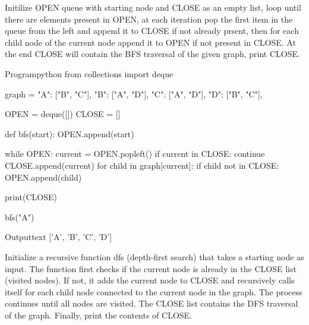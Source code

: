 \documentclass[11pt]{ipu-ai}
\begin{document}
    \newpage%


    {Initilize OPEN queue with starting node and CLOSE as an empty list, loop until there are elements present in OPEN,
        at each iteration pop the first item in the queue from the left and append it to CLOSE if not already prsent,
        then for each child node of the current node append it to OPEN if not present in CLOSE. At the end CLOSE will
        contain the BFS traversal of the given graph, print CLOSE.}

    \begin{code}
        {Program}{python}
from collections import deque

graph = {
    "A": ["B", "C"],
    "B": ["A", "D"],
    "C": ["A", "D"],
    "D": ["B", "C"],
}

OPEN = deque([])
CLOSE = []


def bfs(start):
    OPEN.append(start)

    while OPEN:
        current = OPEN.popleft()
        if current in CLOSE:
            continue
        CLOSE.append(current)
        for child in graph[current]:
            if child not in CLOSE:
                OPEN.append(child)

    print(CLOSE)


bfs("A")
    \end{code}
    \begin{code}
        {Output}{text}
['A', 'B', 'C', 'D']
    \end{code}


    {Initialize a recursive function dfs (depth-first search) that takes a starting node as input. The function first
    checks if the current node is already in the CLOSE list (visited nodes). If not, it adds the current node to CLOSE
    and recursively calls itself for each child node connected to the current node in the graph. The process continues
    until all nodes are visited. The CLOSE list contains the DFS traversal of the graph. Finally, print the contents of
    CLOSE.}
\end{document}
